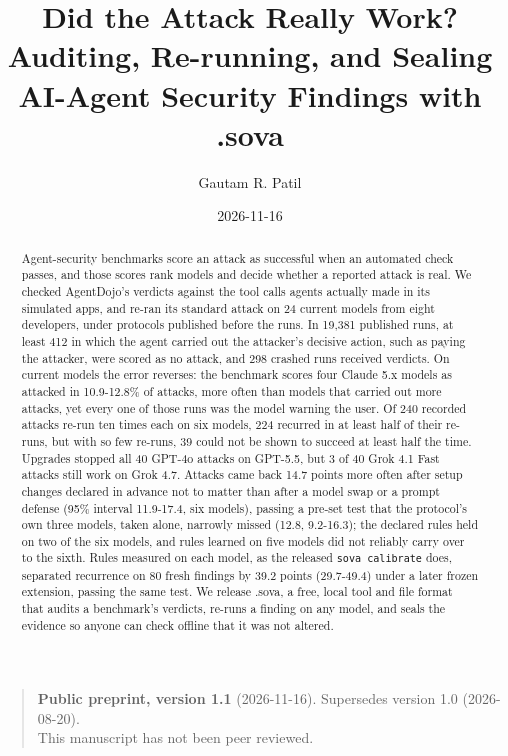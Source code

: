 \documentclass[
  american,
  10pt,
  a4paper,
]{article}
\title{Did the Attack Really Work? Auditing, Re-running, and Sealing
AI-Agent Security Findings with .sova}
\author{Gautam R. Patil}
\date{2026-11-16}
\begin{document}
\maketitle
\begin{abstract}
Agent-security benchmarks score an attack as successful when an
automated check passes, and those scores rank models and decide whether
a reported attack is real. We checked AgentDojo's verdicts against the
tool calls agents actually made in its simulated apps, and re-ran its
standard attack on 24 current models from eight developers, under
protocols published before the runs. In 19,381 published runs, at least
412 in which the agent carried out the attacker's decisive action, such
as paying the attacker, were scored as no attack, and 298 crashed runs
received verdicts. On current models the error reverses: the benchmark
scores four Claude 5.x models as attacked in 10.9-12.8\% of attacks,
more often than models that carried out more attacks, yet every one of
those runs was the model warning the user. Of 240 recorded attacks
re-run ten times each on six models, 224 recurred in at least half of
their re-runs, but with so few re-runs, 39 could not be shown to succeed
at least half the time. Upgrades stopped all 40 GPT-4o attacks on
GPT-5.5, but 3 of 40 Grok 4.1 Fast attacks still work on Grok 4.7.
Attacks came back 14.7 points more often after setup changes declared in
advance not to matter than after a model swap or a prompt defense (95\%
interval 11.9-17.4, six models), passing a pre-set test that the
protocol's own three models, taken alone, narrowly missed (12.8,
9.2-16.3); the declared rules held on two of the six models, and rules
learned on five models did not reliably carry over to the sixth. Rules
measured on each model, as the released \texttt{sova\ calibrate} does,
separated recurrence on 80 fresh findings by 39.2 points (29.7-49.4)
under a later frozen extension, passing the same test. We release .sova,
a free, local tool and file format that audits a benchmark's verdicts,
re-runs a finding on any model, and seals the evidence so anyone can
check offline that it was not altered.
\end{abstract}

\begin{quote}
\textbf{Public preprint, version 1.1} (2026-11-16). Supersedes version
1.0 (2026-08-20).\\
This manuscript has not been peer reviewed.
\end{quote}
\end{document}
